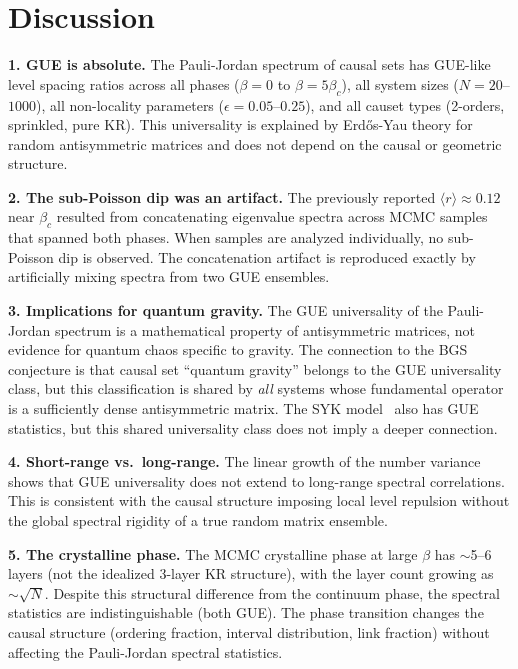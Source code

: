 \documentclass[aps,prd,twocolumn,superscriptaddress,nofootinbib]{revtex4-2}
\begin{document}
\section{Discussion}

\textbf{1. GUE is absolute.} The Pauli-Jordan spectrum of causal sets has GUE-like level spacing ratios across all phases ($\beta = 0$ to $\beta = 5\beta_c$), all system sizes ($N = 20$--$1000$), all non-locality parameters ($\epsilon = 0.05$--$0.25$), and all causet types (2-orders, sprinkled, pure KR). This universality is explained by Erd\H{o}s-Yau theory for random antisymmetric matrices and does not depend on the causal or geometric structure.

\textbf{2. The sub-Poisson dip was an artifact.} The previously reported $\langle r \rangle \approx 0.12$ near $\beta_c$ resulted from concatenating eigenvalue spectra across MCMC samples that spanned both phases. When samples are analyzed individually, no sub-Poisson dip is observed. The concatenation artifact is reproduced exactly by artificially mixing spectra from two GUE ensembles.

\textbf{3. Implications for quantum gravity.} The GUE universality of the Pauli-Jordan spectrum is a mathematical property of antisymmetric matrices, not evidence for quantum chaos specific to gravity. The connection to the BGS conjecture is that causal set ``quantum gravity'' belongs to the GUE universality class, but this classification is shared by \emph{all} systems whose fundamental operator is a sufficiently dense antisymmetric matrix. The SYK model~\cite{sachdev1993,kitaev2015} also has GUE statistics, but this shared universality class does not imply a deeper connection.

\textbf{4. Short-range vs.\ long-range.} The linear growth of the number variance shows that GUE universality does not extend to long-range spectral correlations. This is consistent with the causal structure imposing local level repulsion without the global spectral rigidity of a true random matrix ensemble.

\textbf{5. The crystalline phase.} The MCMC crystalline phase at large $\beta$ has $\sim$5--6 layers (not the idealized 3-layer KR structure), with the layer count growing as $\sim\!\sqrt{N}$. Despite this structural difference from the continuum phase, the spectral statistics are indistinguishable (both GUE). The phase transition changes the causal structure (ordering fraction, interval distribution, link fraction) without affecting the Pauli-Jordan spectral statistics.
\end{document}
